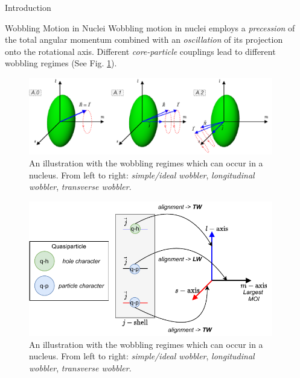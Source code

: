 \documentclass[final]{beamer}
\newlength{\sepwidth}
\newlength{\colwidth}
\newcommand{\separatorcolumn}{\begin{column}{\sepwidth}\end{column}}
\begin{document}
\begin{frame}[t]
\begin{columns}[t]
\separatorcolumn
\begin{column}{\colwidth}
  \begin{block}{Introduction}



  \end{block}
\begin{block}{Wobbling Motion in Nuclei}
  Wobbling motion in nuclei employs a \emph{precession} of the total angular momentum combined with an \emph{oscillation} of its projection onto the rotational axis. Different \emph{core-particle} couplings lead to different wobbling regimes (See Fig. \ref{wobbling-regimes}).
  \begin{figure}
      \centering
     \includegraphics[scale=1.7]{images/wobbling_Regimes_COUPLING_SCHEME.pdf}
      \caption{An illustration with the wobbling regimes which can occur in a nucleus. From left to right: \emph{simple/ideal wobbler}, \emph{longitudinal wobbler}, \emph{transverse wobbler}.}
      \label{wobbling-regimes}
  \end{figure}
  \begin{figure}
      \centering
     \includegraphics[scale=2.2]{images/wobbling_Regimes_updated.pdf}
      \caption{An illustration with the wobbling regimes which can occur in a nucleus. From left to right: \emph{simple/ideal wobbler}, \emph{longitudinal wobbler}, \emph{transverse wobbler}.}
      \label{tw-lw-wobbling}
  \end{figure}


\end{block}
\end{column}
\end{columns}
\end{frame}
\end{document}
